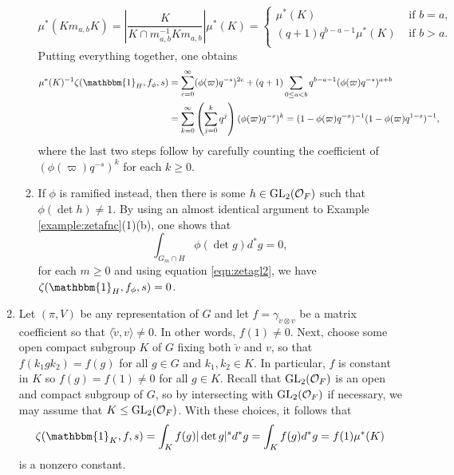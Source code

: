 \begin{example}
\begin{enumerate}[(1)]
\begin{enumerate}
            \[
            \mu^*(Km_{a,b}K)=\left|\frac{K}{K\cap m_{a,b}^{-1}K m_{a,b}}\right|\mu^*(K)=
            \begin{cases}
                \mu^*(K) &\text{ if } b=a,\\
                (q+1)q^{b-a-1}\mu^*(K) &\text{ if } b > a.\\
            \end{cases}
            \]
            Putting everything together, one obtains
            \begin{align*}
                \mu^*(K)^{-1}\zeta(\mathbbm{1}_H,f_\phi,s)&=\sum_{c=0}^{\infty}(\phi(\varpi)q^{-s})^{2c}+(q+1)\sum_{0\leq a< b}q^{b-a-1}(\phi(\varpi)q^{-s})^{a+b}\\
                &=\sum_{k=0}^\infty\left(\sum_{j=0}^k q^j\right)(\phi(\varpi)q^{-s})^k=(1-\phi(\varpi)q^{-s})^{-1}(1-\phi(\varpi)q^{1-s})^{-1},
            \end{align*}
            where the last two steps follow by carefully counting the coefficient of $(\phi(\varpi)q^{-s})^k$ for each $k\geq 0$.
            \item If $\phi$ is ramified instead, then there is some $h\in \mathrm{GL}_2(\mathcal{O}_F)$ such that $\phi(\det h)\neq 1$. By using an almost identical argument to Example \ref{example:zetafnc}(1)(b), one shows that
            $$\int_{G_m\cap H}\phi(\det g)d^*g=0,$$
            for each $m\geq 0$ and using equation \eqref{eqn:zetagl2}, we have $\zeta(\mathbbm{1}_H,f_\phi,s)=0$.
        \end{enumerate} 
        
        \item Let $(\pi,V)$ be any representation of $G$ and let $f=\gamma_{\check{v}\otimes v}$ be a matrix coefficient so that $\langle\check{v},v\rangle\neq 0$. In other words, $f(1)\neq 0$. Next, choose some open compact subgroup $K$ of $G$ fixing both $\check{v}$ and $v$, so that $f(k_1gk_2)=f(g)$ for all $g\in G$ and $k_1,k_2\in K$. In particular, $f$ is constant in $K$ so $f(g)=f(1)\neq 0$ for all $g\in K$. Recall that $\mathrm{GL}_2(\mathcal{O}_F)$ is an open and compact subgroup of $G$, so by intersecting with $\mathrm{GL}_2(\mathcal{O}_F)$ if necessary, we may assume that $K\leq\mathrm{GL}_2(\mathcal{O}_F)$. With these choices, it follows that 
        $$\zeta(\mathbbm{1}_K,f,s)=\int_{K}f(g)|\det g|^sd^*g=\int_K f(g)d^*g=f(1)\mu^*(K)$$ is a nonzero constant.    

    \end{enumerate}
\end{example}

